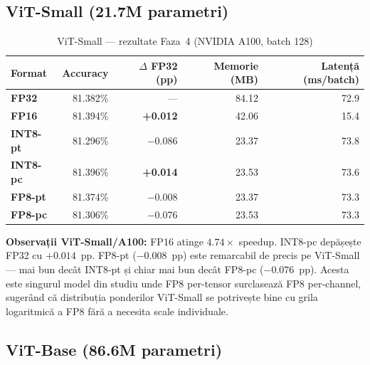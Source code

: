 \documentclass[12pt,a4paper]{article}
\newcommand{\dpos}[1]{\textcolor{posgreen}{\textbf{#1}}}
\newcommand{\dneg}[1]{\textcolor{negred}{#1}}
\begin{document}
\subsection{ViT-Small (21.7M parametri)}

\begin{table}[H]
  \centering
  \caption{ViT-Small — rezultate Faza~4 (NVIDIA A100, batch 128)}
  \begin{tabular}{lrrrr}
    \toprule
    \textbf{Format} & \textbf{Accuracy} & \textbf{$\Delta$ FP32 (pp)} &
    \textbf{Memorie (MB)} & \textbf{Latență (ms/batch)} \\
    \midrule
    \textcolor{fp32color}{\textbf{FP32}}    & 81.382\% & ---                  & 84.12  & 72.9 \\
    \textcolor{fp16color}{\textbf{FP16}}    & 81.394\% & \dpos{+0.012}        & 42.06  & 15.4 \\
    \textcolor{int8ptcolor}{\textbf{INT8-pt}} & 81.296\% & \dneg{$-$0.086}   & 23.37  & 73.8 \\
    \textcolor{int8pccolor}{\textbf{INT8-pc}} & 81.396\% & \dpos{+0.014}     & 23.53  & 73.6 \\
    \textcolor{fp8ptcolor}{\textbf{FP8-pt}}   & 81.374\% & \dneg{$-$0.008}  & 23.37  & 73.3 \\
    \textcolor{fp8pccolor}{\textbf{FP8-pc}}   & 81.306\% & \dneg{$-$0.076}  & 23.53  & 73.3 \\
    \bottomrule
  \end{tabular}
  \label{tab:small}
\end{table}

\textbf{Observații ViT-Small/A100:}
FP16 atinge $\mathbf{4.74\times}$ speedup. INT8-pc depășește FP32 cu
$+0.014$~pp. FP8-pt ($-0.008$~pp) este remarcabil de precis pe ViT-Small
--- mai bun decât INT8-pt și chiar mai bun decât FP8-pc ($-0.076$~pp).
Acesta este singurul model din studiu unde FP8 per-tensor surclasează FP8
per-channel, sugerând că distribuția ponderilor ViT-Small se potrivește
bine cu grila logaritmică a FP8 fără a necesita scale individuale.

\subsection{ViT-Base (86.6M parametri)}
\end{document}
